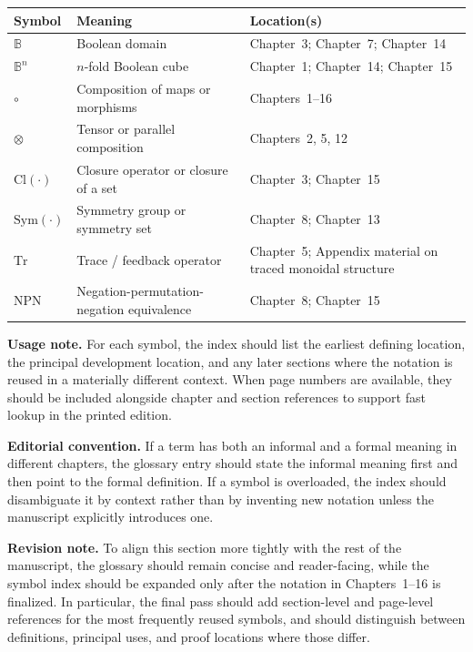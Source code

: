 \begin{center}
\begin{tabular}{|l|l|l|}
\hline
\textbf{Symbol} & \textbf{Meaning} & \textbf{Location(s)} \\
\hline
$\mathbb{B}$ & Boolean domain & Chapter~3; Chapter~7; Chapter~14 \\
\hline
$\mathbb{B}^n$ & $n$-fold Boolean cube & Chapter~1; Chapter~14; Chapter~15 \\
\hline
$\circ$ & Composition of maps or morphisms & Chapters~1--16 \\
\hline
$\otimes$ & Tensor or parallel composition & Chapters~2, 5, 12 \\
\hline
$\mathrm{Cl}(\cdot)$ & Closure operator or closure of a set & Chapter~3; Chapter~15 \\
\hline
$\mathrm{Sym}(\cdot)$ & Symmetry group or symmetry set & Chapter~8; Chapter~13 \\
\hline
$\mathrm{Tr}$ & Trace / feedback operator & Chapter~5; Appendix material on traced monoidal structure \\
\hline
$\mathrm{NPN}$ & Negation-permutation-negation equivalence & Chapter~8; Chapter~15 \\
\hline
\end{tabular}
\end{center}

\medskip

\noindent\textbf{Usage note.} For each symbol, the index should list the earliest defining location, the principal development location, and any later sections where the notation is reused in a materially different context. When page numbers are available, they should be included alongside chapter and section references to support fast lookup in the printed edition.

\medskip

\noindent\textbf{Editorial convention.} If a term has both an informal and a formal meaning in different chapters, the glossary entry should state the informal meaning first and then point to the formal definition. If a symbol is overloaded, the index should disambiguate it by context rather than by inventing new notation unless the manuscript explicitly introduces one.

\medskip

\noindent\textbf{Revision note.} To align this section more tightly with the rest of the manuscript, the glossary should remain concise and reader-facing, while the symbol index should be expanded only after the notation in Chapters~1--16 is finalized. In particular, the final pass should add section-level and page-level references for the most frequently reused symbols, and should distinguish between definitions, principal uses, and proof locations where those differ.

